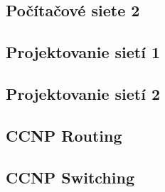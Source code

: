 \subsection{Počítačové siete 2}

\subsection{Projektovanie sietí 1}

\subsection{Projektovanie sietí 2}

\subsection{CCNP Routing}

\subsection{CCNP Switching}